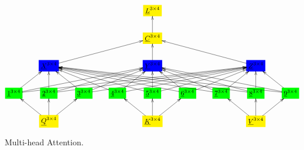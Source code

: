 \documentclass[12pt]{article}
\begin{document}
\begin{figure}[h!]\centering
$$\xymatrix{
&&&&*+[F*:yellow]{\underline{L}^{3\times  4}}&&&&
\\
&&&&*+[F*:yellow]{\underline{C}^{3\times  4}}\ar[u]&&&&
\\
&*+[F*:blue]{\underline{X}^{3\times  4}}\ar[urrr]&&&*+[F*:blue]{\underline{Y}^{3\times  4}}\ar[u]&&&*+[F*:blue]{\underline{Z}^{3\times  4}}\ar[ulll]&
\\
*+[F*:green]{\underline{1}^{3\times  4}}\ar[ur]\ar[urrrr]\ar[urrrrrrr]&*+[F*:green]{\underline{2}^{3\times  4}}\ar[u]\ar[urrr]\ar[urrrrrr]&*+[F*:green]{\underline{3}^{3\times  4}}\ar[ul]\ar[urr]\ar[urrrrr]&*+[F*:green]{\underline{4}^{3\times  4}}\ar[ull]\ar[ur]\ar[urrrr]&*+[F*:green]{\underline{5}^{3\times  4}}\ar[ulll]\ar[u]\ar[urrr]&*+[F*:green]{\underline{6}^{3\times  4}}\ar[ullll]\ar[ul]\ar[urr]&*+[F*:green]{\underline{7}^{3\times  4}}\ar[ulllll]\ar[ull]\ar[ur]&*+[F*:green]{\underline{8}^{3\times  4}}\ar[ullllll]\ar[ulll]\ar[u]&*+[F*:green]{\underline{9}^{3\times  4}}\ar[ulllllll]\ar[ullll]\ar[ul]
\\
&*+[F*:yellow]{\underline{Q}^{3\times  4}}\ar[ul]\ar[u]\ar[ur]&&&*+[F*:yellow]{\underline{K}^{3\times  4}}\ar[ul]\ar[u]\ar[ur]&&&*+[F*:yellow]{\underline{V}^{3\times  4}}\ar[ul]\ar[u]\ar[ur]&
}$$
\caption{Multi-head Attention.}
\label{fig-texnn-for-multi-head-att}
\end{figure}
\end{document}
